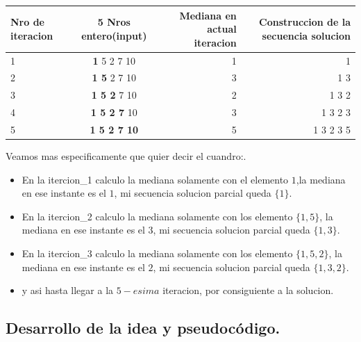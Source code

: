 \begin{center}
   \begin{tabular}{| l | c | r | r |}
     \hline
     Nro de iteracion & 5 Nros entero(input)  &  Mediana en actual iteracion & Construccion de la secuencia solucion \\ \hline
     1 & \textbf{1} 5 2 7 10  & 1 & 1 \\ \hline 
     2 & \textbf{1 5} 2 7 10  & 3 & 1 3 \\ \hline 
     3 & \textbf{1 5 2} 7 10  & 2 & 1 3 2 \\ \hline 
     4 & \textbf{1 5 2 7} 10  & 3 & 1 3 2 3\\ \hline 
     5 & \textbf{1 5 2 7 10}  & 5 & 1 3 2 3 5\\ \hline 
     \hline
   \end{tabular}
\end{center} 

Veamos mas especificamente que quier decir el cuandro:.

\begin{itemize}
    \item En la itercion_1 calculo la mediana solamente con el elemento $1$,la mediana en ese instante es el $1$, mi secuencia solucion parcial queda $\{1\}$.
    \item En la itercion_2 calculo la mediana solamente con los elemento $\{1,5\}$, la mediana en ese instante es el $3$, mi secuencia solucion parcial queda $\{1,3\}$.
    \item En la itercion_3 calculo la mediana solamente con los elemento $\{1,5,2\}$, la mediana en ese instante es el $2$, mi secuencia solucion parcial queda $\{1,3,2\}$.
	\item y asi hasta llegar a la $5-esima$ iteracion, por consiguiente a la solucion.
\end{itemize}



\newpage
\subsection{Desarrollo de la idea y pseudocódigo.}

\vspace*{0.3cm}






